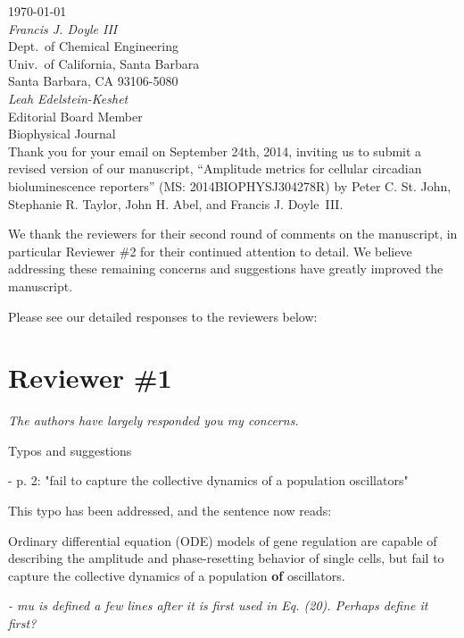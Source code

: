 \documentclass[11pt, letterpaper]{article}
\newenvironment{reviewer}{\itshape\color{gray}}{}
\newenvironment{manuscript}[1]{\begin{center}\begin{tcolorbox}[colback=green!5!white,colframe=green!75!black,width=0.8\textwidth,title={#1},breakable,fonttitle=\bfseries]}{\end{tcolorbox}\end{center}}
\begin{document}
\today\\

{\itshape Francis J. Doyle III}\\
Dept.\ of Chemical Engineering\\
Univ.\ of California, Santa Barbara\\
Santa Barbara, CA 93106-5080\\

{\itshape Leah Edelstein-Keshet}\\
Editorial Board Member\\
Biophysical Journal\\

Thank you for your email on September 24th, 2014, inviting us to submit a revised version of our manuscript, ``Amplitude metrics for cellular circadian bioluminescence reporters'' (MS: 2014BIOPHYSJ304278R) by Peter C. St. John, Stephanie R. Taylor, John H. Abel, and Francis J. Doyle~III.

We thank the reviewers for their second round of comments on the manuscript, in particular Reviewer \#2 for their continued attention to detail. We believe addressing these remaining concerns and suggestions have greatly improved the manuscript.

Please see our detailed responses to the reviewers below: 

\section*{Reviewer \#1}
\begin{reviewer}
The authors have largely responded you my concerns. 
 
Typos and suggestions 
 
- p. 2: "fail to capture the collective dynamics of a population oscillators" 
\end{reviewer}

This typo has been addressed, and the sentence now reads:

\begin{manuscript}{Page 2}
  Ordinary differential equation (ODE) models of gene regulation are capable of describing the amplitude and phase-resetting behavior of single cells, but fail to capture the collective dynamics of a population {\bfseries of} oscillators.
\end{manuscript}
 
\begin{reviewer}
- mu is defined a few lines after it is first used in Eq. (20). Perhaps define it first? 
\end{reviewer}
\end{document}
